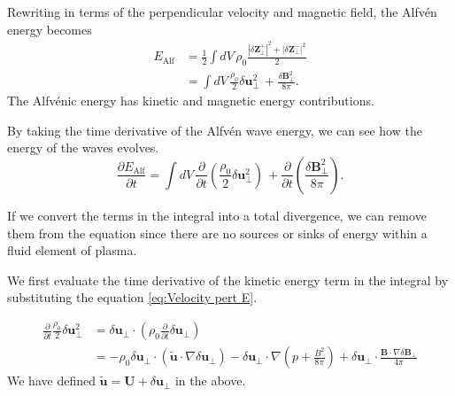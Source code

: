 Rewriting in terms of the perpendicular velocity and magnetic field, the Alfv\'en energy becomes
\begin{equation*}
\begin{split}
    E_{\mathrm{Alf}} &= \frac{1}{2} \int dV\, \rho_{0} \frac{\left| \delta\boldsymbol{Z}_{\perp}^{+} \right|^{2} + \left| \delta\boldsymbol{Z}_{\perp}^{-} \right|^{2}}{2}\\
    &=\int dV\, \frac{\rho_{0}}{2}\delta \boldsymbol{u}_{\perp}^2\, + \frac{\delta \boldsymbol{B}_{\perp}^2}{8\pi}.
\end{split}
\end{equation*}
The Alfv\'enic energy has kinetic and magnetic energy contributions.

By taking the time derivative of the Alfv\'en wave energy, we can see how the energy of the waves evolves. 
\begin{equation*}
    \frac{\partial E_{\mathrm{Alf}}}{\partial t} = \int dV\, \frac{\partial}{\partial t}\left( \frac{\rho_{0}}{2}\delta \boldsymbol{u}_{\perp}^2\right)\, + \frac{\partial}{\partial t}\left( \frac{\delta \boldsymbol{B}_{\perp}^2}{8\pi}\right).
\end{equation*}

If we convert the terms in the integral into a total divergence, we can remove them from the equation since there are no sources or sinks of energy within a fluid element of plasma.

We first evaluate the time derivative of the kinetic energy term in the integral by substituting the equation \eqref{eq:Velocity pert E}.

\begin{equation}
\begin{split}
    \frac{\partial}{\partial t} \frac{\rho_{0}}{2}\delta \boldsymbol{u}_{\perp}^2
    &= \delta \boldsymbol{u}_{\perp} \cdot \left( \rho_{0} \frac{\partial}{\partial t} \delta \boldsymbol{u}_{\perp} \right)\\
    &=-\rho_{0} \delta \boldsymbol{u}_{\perp} \cdot (\tilde{\boldsymbol{u}}\cdot \nabla\delta \boldsymbol{u}_{\perp}) -\delta \boldsymbol{u}_{\perp} \cdot \nabla\left( p +\frac{B^2}{8\pi}\right)+  \delta \boldsymbol{u}_{\perp} \cdot \frac{\boldsymbol{B}\cdot \nabla \delta \boldsymbol{B}_{\perp}}{4\pi}
    \label{eq:Alfven E U Long}
\end{split}
\end{equation}
We have defined \(\tilde{\boldsymbol{u}}= \boldsymbol{U} +\delta \boldsymbol{u}_{\perp} \) in the above.

